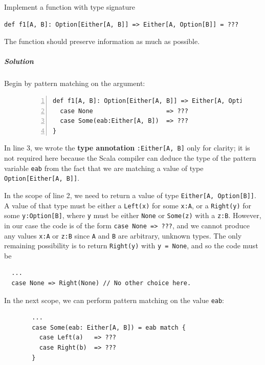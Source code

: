 Implement a function with type signature
\begin{lstlisting}
def f1[A, B]: Option[Either[A, B]] => Either[A, Option[B]] = ???
\end{lstlisting}
The function should preserve information as much as possible.

\subparagraph{Solution}

Begin by pattern matching on the argument:

\begin{figure}%
\vspace{-0.95\baselineskip}
\begin{lstlisting}[numbers=left]
def f1[A, B]: Option[Either[A, B]] => Either[A, Option[B]] = {
  case None                    => ???
  case Some(eab:Either[A, B])  => ???
}
\end{lstlisting}

\vspace{-1.15\baselineskip}
\end{figure}%

\noindent In line 3, we wrote the \textbf{type annotation}
\lstinline!:Either[A, B]! only for clarity; it is not required here
because the Scala compiler can deduce the type of the pattern variable
\lstinline!eab! from the fact that we are matching a value of type
\lstinline!Option[Either[A, B]]!.

In the scope of line 2, we need to return a value of type \lstinline!Either[A, Option[B]]!.
A value of that type must be either a \lstinline!Left(x)! for some
\lstinline!x:A!, or a \lstinline!Right(y)! for some \lstinline!y:Option[B]!,
where \lstinline!y! must be either \lstinline!None! or \lstinline!Some(z)!
with a \lstinline!z:B!. However, in our case the code is of the form
\lstinline!case None => ???!, and we cannot produce any values \lstinline!x:A!
or \lstinline!z:B! since \lstinline!A! and \lstinline!B! are arbitrary,
unknown types. The only remaining possibility is to return \lstinline!Right(y)!
with \lstinline!y = None!, and so the code must be
\begin{lstlisting}
  ...
  case None => Right(None) // No other choice here.
\end{lstlisting}

In the next scope, we can perform pattern matching on the value \lstinline!eab!:

\begin{figure}%
\vspace{-0.8\baselineskip}
\begin{lstlisting}
  ...
  case Some(eab: Either[A, B]) = eab match {
    case Left(a)   => ???
    case Right(b)  => ???
  }
\end{lstlisting}

\vspace{-0.9\baselineskip}
\end{figure}%

